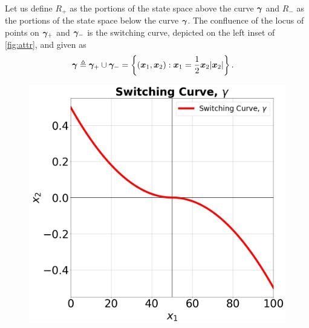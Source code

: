 Let us define $R_+$ as the portions of the state space above the curve $\bm{\gamma}$ and $R_-$ as the portions of the state space below the curve $\bm{\gamma}$.  The confluence of the locus of points on $\bm{\gamma}_+$ and $\bm{\gamma}_-$ is the switching curve, depicted on the left inset of \autoref{fig:attr}, and given as
%
\begin{align}
	\bm{\gamma} \triangleq \bm{\gamma}_+ \cup \bm{\gamma}_- &= \left\{(\bm{x}_1, \bm{x}_2): \bm{x}_1 = \frac{1}{2}\bm{x}_2 |\bm{x}_2| \right\}.
\end{align}
%
\begin{figure}[tb!]
	\centering
	\begin{minipage}[b]{.24\textwidth}
		\includegraphics[width=1.0\textwidth, height=1.0\textwidth]{figures/switching_curve.jpg}
	\end{minipage}
	\begin{minipage}[b]{.24\textwidth}

\end{minipage}
\end{figure}
